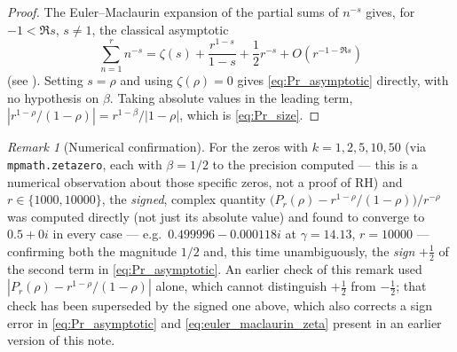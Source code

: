 \documentclass[11pt]{amsart}
\numberwithin{equation}{section}
\theoremstyle{plain}
\theoremstyle{definition}
\theoremstyle{remark}
\newtheorem{remark}[theorem]{Remark}
\newcommand{\zetaR}{\zeta}
\begin{document}
\begin{proof}
The Euler--Maclaurin expansion of the partial sums of \(n^{-s}\) gives, for \(-1<\Re s\), \(s\ne1\), the classical asymptotic
\begin{equation}
\sum_{n=1}^r n^{-s}=\zetaR(s)+\frac{r^{1-s}}{1-s}+\frac12r^{-s}+O(r^{-1-\Re s})
\label{eq:euler_maclaurin_zeta}
\end{equation}
(see \cite{Apostol1976,Titchmarsh1986}).  Setting \(s=\rho\) and using \(\zetaR(\rho)=0\) gives \eqref{eq:Pr_asymptotic} directly, with no hypothesis on \(\beta\).  Taking absolute values in the leading term, \(|r^{1-\rho}/(1-\rho)|=r^{1-\beta}/|1-\rho|\), which is \eqref{eq:Pr_size}.
\end{proof}

\begin{remark}[Numerical confirmation]
\label{rem:Pr_asymptotic_numeric}
For the zeros with \(k=1,2,5,10,50\) (via \texttt{mpmath.zetazero}, each with \(\beta=1/2\) to the precision computed — this is a numerical observation about those specific zeros, not a proof of RH) and \(r\in\{1000,10000\}\), the \emph{signed}, complex quantity \(\bigl(P_r(\rho)-r^{1-\rho}/(1-\rho)\bigr)/r^{-\rho}\) was computed directly (not just its absolute value) and found to converge to \(0.5+0i\) in every case — e.g.\ \(0.499996-0.000118i\) at \(\gamma=14.13\), \(r=10000\) — confirming both the magnitude \(1/2\) and, this time unambiguously, the \emph{sign} \(+\tfrac12\) of the second term in \eqref{eq:Pr_asymptotic}.  An earlier check of this remark used \(|P_r(\rho)-r^{1-\rho}/(1-\rho)|\) alone, which cannot distinguish \(+\tfrac12\) from \(-\tfrac12\); that check has been superseded by the signed one above, which also corrects a sign error in \eqref{eq:Pr_asymptotic} and \eqref{eq:euler_maclaurin_zeta} present in an earlier version of this note.
\end{remark}
\end{document}
